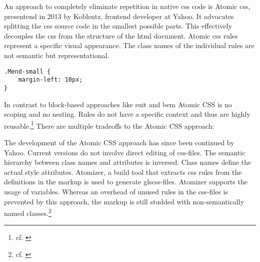 An approach to completely eliminate repetition in native \gls{css} code is Atomic \gls{css}, presentend in 2013 by Koblentz, frontend developer at Yahoo.
It advocates splitting the \gls{css} source code in the smallest possible parts.
This effectively decouples the \gls{css} from the structure of the \gls{html} document.
Atomic \gls{css} rules represent a specific visual appearance.
The class names of the individual rules are not semantic but representational.


\begin{verbatim}
.Mend-small {
    margin-left: 10px;
}
\end{verbatim}

In contrast to block-based approaches like \gls{suit} and \gls{bem} Atomic CSS is no scoping and no nesting.
Rules do not have a specific context and thus are highly reusable.\footnote{cf. \cite{atomiccssarticle}}
There are multiple tradeoffs to the Atomic CSS approach:


The development of the Atomic CSS approach has since been continued by Yahoo.
Current versions do not involve direct editing of \gls{css}-files.
The semantic hierarchy between class names and attributes is inversed.
Class names define the actual style attributes.
Atomizer, a build tool that extracts \gls{css} rules from the definitions in the markup is used to generate gls{css}-files.
Atomizer supports the usage of variables.
Whereas an overhead of unused rules in the \gls{css}-files is prevented by this approach, the markup is still studded with non-semantically named classes.\footnote{cf. \cite{atomiccsssite}}

